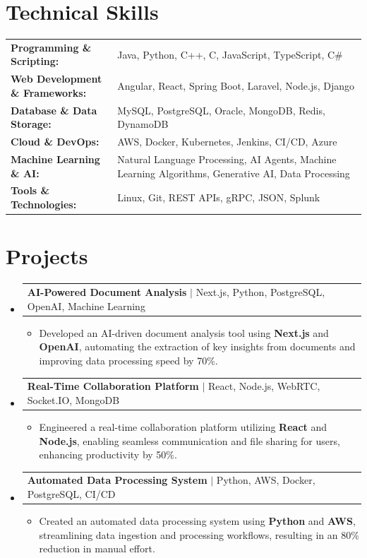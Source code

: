 \documentclass[letterpaper,10pt]{article}
\makeatletter
\newcommand{\resumeItem}[1]{
  \item{\fontsize{8pt}{9pt}\selectfont
    #1 \vspace{-3pt}
  }
}
\newcommand{\resumeProjectHeading}[2]{
    \item
    \begin{tabular*}{1.001\textwidth}{l@{\extracolsep{\fill}}r}
      \fontsize{8.5pt}{10pt}#1 & \textbf{\fontsize{8.5pt}{10pt} #2}\\
    \end{tabular*}\vspace{-7pt}
}
\newcommand{\resumeSubHeadingListStart}{\begin{itemize}[leftmargin=0pt, label={}]}
\newcommand{\resumeSubHeadingListEnd}{\end{itemize}}
\newcommand{\resumeItemListStart}{\begin{itemize}[leftmargin=*]}
\newcommand{\resumeItemListEnd}{\end{itemize}\vspace{-5pt}}
\makeatother
\begin{document}
\section{Technical Skills}
        \vspace{-14pt}
        \begin{table}[h]
            \fontsize{8pt}{9pt}\selectfont
            \begin{tabular}{p{0.3\linewidth} p{0.7\linewidth}}
                \textbf{Programming \& Scripting:} & Java, Python, C++, C, JavaScript, TypeScript, C\# \\
                \textbf{Web Development \& Frameworks:} & Angular, React, Spring Boot, Laravel, Node.js, Django \\
                \textbf{Database \& Data Storage:} & MySQL, PostgreSQL, Oracle, MongoDB, Redis, DynamoDB \\
                \textbf{Cloud \& DevOps:} & AWS, Docker, Kubernetes, Jenkins, CI/CD, Azure \\
                \textbf{Machine Learning \& AI:} & Natural Language Processing, AI Agents, Machine Learning Algorithms, Generative AI, Data Processing \\
                \textbf{Tools \& Technologies:} & Linux, Git, REST APIs, gRPC, JSON, Splunk \\
            \end{tabular}
        \end{table}
 \vspace{-18pt}

\section{Projects}
    \vspace{-5pt}
    \resumeSubHeadingListStart
          \resumeProjectHeading
            {\textbf{AI-Powered Document Analysis} $|$ Next.js, Python, PostgreSQL, OpenAI, Machine Learning}{}
            \resumeItemListStart
                \resumeItem{Developed an AI-driven document analysis tool using \textbf{Next.js} and \textbf{OpenAI}, automating the extraction of key insights from documents and improving data processing speed by 70\%.}
            \resumeItemListEnd
        \vspace{-12pt}
    
        \resumeProjectHeading
            {\textbf{Real-Time Collaboration Platform} $|$ React, Node.js, WebRTC, Socket.IO, MongoDB}{}
        \resumeItemListStart
                \resumeItem{Engineered a real-time collaboration platform utilizing \textbf{React} and \textbf{Node.js}, enabling seamless communication and file sharing for users, enhancing productivity by 50\%.}
        \resumeItemListEnd
      \vspace{-12pt}
      \resumeProjectHeading
        {\textbf{Automated Data Processing System} $|$ Python, AWS, Docker, PostgreSQL, CI/CD}{}
    \resumeItemListStart
            \resumeItem{Created an automated data processing system using \textbf{Python} and \textbf{AWS}, streamlining data ingestion and processing workflows, resulting in an 80\% reduction in manual effort.}
    \resumeItemListEnd
    \resumeSubHeadingListEnd
\end{document}
